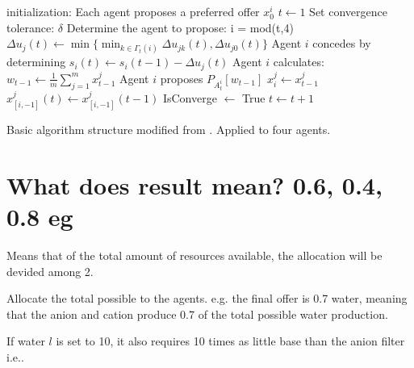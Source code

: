 \begin{algorithm}[h]
	initialization: Each agent proposes a preferred offer $x^i_0$\;
	$t\leftarrow1$\;
	Set convergence tolerance: $\delta$\;
	{
		Determine the agent to propose: i = mod(t,4)\;
		{
			{
				{
					$\Delta u_j(t)\leftarrow \min \{\min_{k\in\Gamma_t(i)}\Delta u_{jk}(t), \Delta u_{j0}(t)\}$ \;	
				}
				Agent $i$ concedes by determining $s_i(t)\leftarrow s_i(t-1)-\Delta u_j(t)$\;
				Agent $i$ calculates: $w_{t-1}\leftarrow \frac{1}{m}\sum_{j=1}^{m}x^j_{t-1}$\;
				Agent $i$ proposes $P_{A^i_t}[w_{t-1}]$\;
			}{
				$x^j_i \leftarrow x^j_{t-1}$\;
				$x^j_{[i,-1]}(t) \leftarrow x^j_{[i,-1]}(t-1)$\;
			}
		}
		{
			IsConverge $\leftarrow $ True\;
		}{
			$t \leftarrow t+1$\;
		}
	}
\caption{Basic algorithm structure modified from \citep{zheng2015automated}. Applied to four agents.}
\label{al:algorithm1}
\end{algorithm}
\clearpage
\section{What does result mean? 0.6, 0.4, 0.8 eg}
Means that of the total amount of resources available, the allocation will be devided among 2. 

Allocate the total possible to the agents. e.g. the final offer is 0.7 water, meaning that the anion and cation produce 0.7 of the total possible water production. 

If water $l$ is set to 10, it also requires 10 times as little base than the anion filter i.e..

